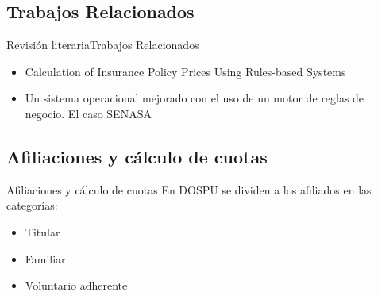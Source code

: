 \documentclass[10pt]{beamer}
\begin{document}
\subsection{Trabajos Relacionados}
\begin{frame}{Revisión literaria}{Trabajos Relacionados}
    \begin{itemize}
        \item Calculation of Insurance Policy Prices Using Rules-based Systems
        \item Un sistema operacional mejorado con el uso de un motor de reglas de negocio. El caso SENASA
    \end{itemize}
\end{frame}
\begin{comment}
Para cumplir con los objetivos propuestos, se comenzó por realizar una revisión de la literatura disponible afín al tema. Primeramente, se realizó la búsqueda de trabajos similares, los trabajos de mayor similitud fueron:

En el primer trabajo se reporta un uso similar de un BRMS para el cálculo de los precios de las distintas pólizas de una aseguradora, siendo el principal objetivo buscado la mantenibilidad y la adaptabilidad a cambios en las regulaciones.

El segundo trabajo, en el contexto nacional, se describe el uso de un BRMS en aplicaciones desarrolladas para SENASA con el objetivo de lograr que tengan mayor flexibilidad frente a cambios en las reglas de negocio que rigen los proceso que soportan.

También se detectó que en sistemas informáticos para organismos de salud privados, se argumenta flexibilidad en la especificación de reglas de negocio, pero sin mayor detalle que el comercial.
\end{comment}

\subsection{Afiliaciones y cálculo de cuotas}

\begin{frame}{Afiliaciones y cálculo de cuotas}
    En DOSPU se dividen a los afiliados en las categorías:
    \begin{itemize}
        \item Titular
        \item Familiar
        \item Voluntario adherente
    \end{itemize}
\end{frame}
\begin{comment}
De las ordenanzas que dictan las normativas de DOSPU, podemos ver que los afiliados estan divididos en tres subcategorías:
- Titular
- Familiar, de un afiliado titular
- Voluntario Adherente
\end{comment}
\end{document}
